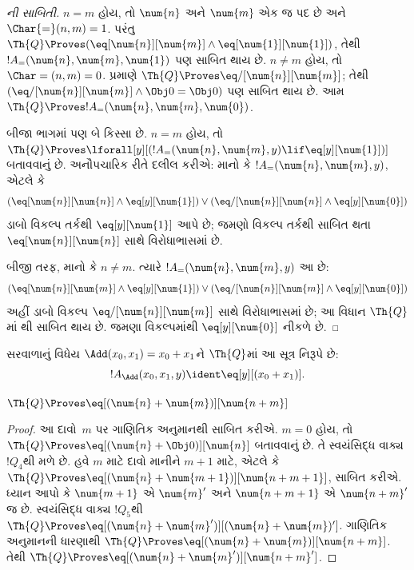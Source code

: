 \documentclass[../../../include/open-logic-section]{subfiles}
\begin{document}
\begin{proof}[ની સાબિતી]
$n = m$ હોય, તો $\num{n}$ અને
$\num{m}$ એક જ પદ છે અને
$\Char{=}(n, m) = 1$.
પરંતુ $\Th{Q} \Proves
(\eq[\num{n}][\num{m}] \land
\eq[\num{1}][\num{1}])$,
તેથી $!A_=(\num{n}, \num{m},
\num{1})$ પણ સાબિત થાય છે.
$n \neq m$ હોય, તો
$\Char=(n, m) = 0$.
 પ્રમાણે
$\Th{Q} \Proves \eq/[\num{n}][\num{m}]$;
તેથી
$(\eq/[\num{n}][\num{m}] \land \Obj 0 = \Obj 0)$
પણ સાબિત થાય છે. આમ
$\Th{Q} \Proves !A_=(\num{n},
\num{m}, \num{0})$.

બીજા ભાગમાં પણ બે કિસ્સા છે.
$n = m$ હોય, તો
$\Th{Q} \Proves \lforall[y][(!A_=(\num{n}, \num{m}, y)
  \lif \eq[y][\num{1}])]$
બતાવવાનું છે. અનૌપચારિક રીતે
દલીલ કરીએ: માનો કે
$!A_=(\num{n}, \num{m}, y)$,
એટલે કે
\[
(\eq[\num{n}][\num{n}] \land \eq[y][\num{1}]) \lor
(\eq/[\num{n}][\num{n}] \land \eq[y][\num{0}])
\]
ડાબો વિકલ્પ તર્કથી
$\eq[y][\num{1}]$ આપે છે;
જમણો વિકલ્પ તર્કથી સાબિત થતા
$\eq[\num{n}][\num{n}]$ સાથે
વિરોધાભાસમાં છે.

બીજી તરફ, માનો કે $n \neq m$.
ત્યારે $!A_=(\num{n},
\num{m}, y)$ આ છે:
\[
(\eq[\num{n}][\num{m}] \land \eq[y][\num{1}]) \lor
(\eq/[\num{n}][\num{m}] \land \eq[y][\num{0}])
\]
અહીં ડાબો વિકલ્પ
$\eq/[\num{n}][\num{m}]$ સાથે
વિરોધાભાસમાં છે; આ વિધાન
$\Th{Q}$માં
થી
સાબિત થાય છે. જમણા
વિકલ્પમાંથી $\eq[y][\num{0}]$
નીકળે છે.
\end{proof}

\begin{prop}
સરવાળાનું વિધેય
$\Add(x_0, x_1) = x_0+x_1$ને
$\Th{Q}$માં આ સૂત્ર નિરૂપે છે:
\[
  !A_{\Add}(x_0, x_1, y) \ident \eq[y][(x_0 + x_1)].
\]
\end{prop}

\begin{lem}
$\Th{Q} \Proves \eq[(\num{n} + \num{m})][\num{n+m}]$
\end{lem}

\begin{proof}
આ દાવો~$m$ પર ગાણિતિક અનુમાનથી
સાબિત કરીએ. $m = 0$ હોય, તો
$\Th{Q} \Proves
\eq[(\num{n} + \Obj 0)][\num{n}]$
બતાવવાનું છે. તે સ્વયંસિદ્ધ
વાક્ય~$!Q_4$થી મળે છે.
હવે $m$ માટે દાવો માનીને
$m+1$ માટે, એટલે કે
$\Th{Q} \Proves \eq[(\num{n} +
  \num{m+1})][\num{n+m+1}]$,
સાબિત કરીએ. ધ્યાન આપો કે
$\num{m+1}$ એ $\num{m}'$
અને $\num{n+m+1}$ એ
$\num{n+m}'$ જ છે.
સ્વયંસિદ્ધ વાક્ય $!Q_5$થી
$\Th{Q} \Proves
\eq[(\num{n} + \num{m}')][(\num{n}+\num{m})']$.
ગાણિતિક અનુમાનની ધારણાથી
$\Th{Q} \Proves
\eq[(\num{n} + \num{m})][\num{n+m}]$.
તેથી $\Th{Q} \Proves
\eq[(\num{n} + \num{m}')][\num{n+m}']$.
\end{proof}
\end{document}
